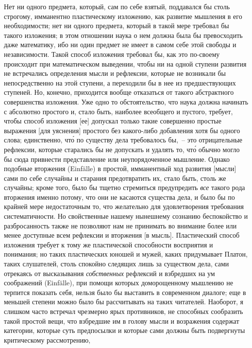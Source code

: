 Нет ни одного предмета, который, сам по себе взятый,
поддавался бы столь строгому, имманентно пластическому
изложению, как развитие мышления в его необходимости;
нет ни одного предмета, который в такой мере требовал
бы такого изложения; в этом отношении наука о нем
должна была бы превосходить даже математику, ибо ни
один предмет не имеет в самом себе этой свободы и независимости.
Такой способ изложения требовал бы, как это
по-своему происходит при математическом выведении,
чтобы ни на одной ступени развития не встречались определения
мысли и рефлексии, которые не возникали бы
непосредственно на этой ступени, а переходили бы в нее
из предшествующих ступеней. Но, конечно, приходится
вообще отказаться от такого абстрактного совершенства
изложения. Уже одно то обстоятельство, что наука должна
начинать с абсолютно простого и, стало быть, наиболее
всеобщего и пустого, требует, чтобы способ изложения [ее]
допускал только такие совершенно простые выражения
[для уяснения] простого без какого-либо добавления хотя
бы одного слова; единственно, чт\'о по существу дела требовалось
бы,~-- это отрицательные рефлексии, которые старались
бы не допускать и удалять то, чт\'о обычно могло
бы сюда привнести представление или неупорядоченное
мышление. Однако подобные вторжения (Einfälle) в простой,
имманентный ход развития [мысли] сами по себе
случайны и старания предотвратить их, стало быть, столь
же случайны; кроме того, было бы тщетно стремиться
предупредить \emph{все} такого рода вторжения именно потому,
что они не касаются существа дела, и было бы по крайней
мере недостаточным то, что желательно для удовлетворения
требования систематичности. Но свойственные
нашему нынешнему сознанию беспокойство и разбросанность
также не позволяют нам не принимать во внимание
более или менее доступные всем рефлексии и вторжения
[в мысль]. Пластический способ изложения требует к тому
же пластической способности восприятия и понимания\endnotemark{};
но таких пластических юношей и мужей, каких
придумывает Платон, таких слушателей, столь спокойно
следящих лишь за существом дела, сами отрекаясь от
высказывания \emph{собственных} рефлексий и взбредших на ум
соображений (Einfälle), при помощи которых доморощенному
мышлению не терпится показать себя, нельзя
было бы выставить в современном диалоге; еще в меньшей
степени можно было бы рассчитывать на таких читателей.
Наоборот, я слишком часто встречал чрезмерно
ярых противников, не способных сообразить такой простой
вещи, что взбредшие им в голову мысли и возражения
содержат категории, которые суть предпосылки и которые
сами должны быть подвергнуты критическому рассмотрению,
